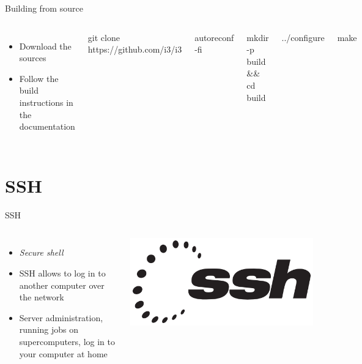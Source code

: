     \begin{frame}[t,fragile]{Building from source}
        \begin{columns}[T]
            \begin{itemize}
                \item Download the sources
                \item Follow the build instructions in the documentation
            \end{itemize}
            \begin{bashenv}[\small]
git clone https://github.com/i3/i3
            \end{bashenv}
            \begin{bashenv}[\small]
autoreconf -fi
            \end{bashenv}
            \begin{bashenv}[\small]
mkdir -p build && cd build
            \end{bashenv}
            \begin{bashenv}[\small]
../configure
            \end{bashenv}
            \begin{bashenv}[\small]
make
            \end{bashenv}
        \end{columns}
    \end{frame}

    \section{SSH}

    \begin{frame}[t,fragile]{SSH}
        \begin{columns}[T]
            \begin{itemize}
                \item \emph{Secure shell}
                \item SSH allows to log in to another computer over the network
                \item Server administration, running jobs on supercomputers,
                    log in to your computer at home
            \end{itemize}
            \begin{center}
                \includegraphics[width=0.6\columnwidth]{img/ssh.png}
            \end{center}
        \end{columns}
    \end{frame}

